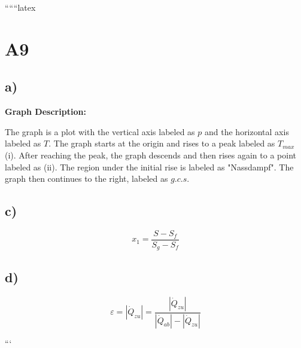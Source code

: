 
``````latex


\section*{A9}

\subsection*{a)}

\begin{center}
\textbf{Graph Description:}
\end{center}

The graph is a plot with the vertical axis labeled as \( p \) and the horizontal axis labeled as \( T \). The graph starts at the origin and rises to a peak labeled as \( T_{max} \) (i). After reaching the peak, the graph descends and then rises again to a point labeled as (ii). The region under the initial rise is labeled as "Nassdampf". The graph then continues to the right, labeled as \( g.c.s \).

\subsection*{c)}

\[
x_1 = \frac{S - S_f}{S_g - S_f}
\]

\subsection*{d)}

\[
\varepsilon = \left| \dot{Q}_{zu} \right| = \frac{\left| \dot{Q}_{zu} \right|}{\left| \dot{Q}_{ab} \right| - \left| \dot{Q}_{zu} \right|}
\]

```